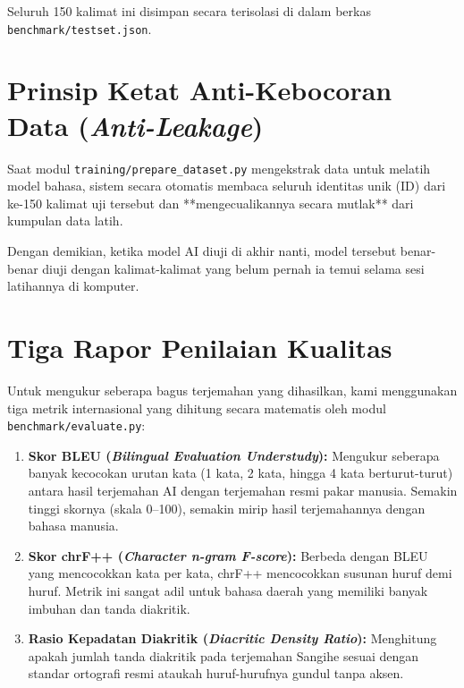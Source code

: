 Seluruh 150 kalimat ini disimpan secara terisolasi di dalam berkas \texttt{benchmark/testset.json}.

\section{Prinsip Ketat Anti-Kebocoran Data (\textit{Anti-Leakage})}
Saat modul \texttt{training/prepare\_dataset.py} mengekstrak data untuk melatih model bahasa, sistem secara otomatis membaca seluruh identitas unik (ID) dari ke-150 kalimat uji tersebut dan **mengecualikannya secara mutlak** dari kumpulan data latih.

Dengan demikian, ketika model AI diuji di akhir nanti, model tersebut benar-benar diuji dengan kalimat-kalimat yang belum pernah ia temui selama sesi latihannya di komputer.

\section{Tiga Rapor Penilaian Kualitas}
Untuk mengukur seberapa bagus terjemahan yang dihasilkan, kami menggunakan tiga metrik internasional yang dihitung secara matematis oleh modul \texttt{benchmark/evaluate.py}:
\begin{enumerate}
    \item \textbf{Skor BLEU (\textit{Bilingual Evaluation Understudy}):} Mengukur seberapa banyak kecocokan urutan kata (1 kata, 2 kata, hingga 4 kata berturut-turut) antara hasil terjemahan AI dengan terjemahan resmi pakar manusia. Semakin tinggi skornya (skala 0--100), semakin mirip hasil terjemahannya dengan bahasa manusia.
    \item \textbf{Skor chrF++ (\textit{Character n-gram F-score}):} Berbeda dengan BLEU yang mencocokkan kata per kata, chrF++ mencocokkan susunan huruf demi huruf. Metrik ini sangat adil untuk bahasa daerah yang memiliki banyak imbuhan dan tanda diakritik.
    \item \textbf{Rasio Kepadatan Diakritik (\textit{Diacritic Density Ratio}):} Menghitung apakah jumlah tanda diakritik pada terjemahan Sangihe sesuai dengan standar ortografi resmi ataukah huruf-hurufnya gundul tanpa aksen.
\end{enumerate}
